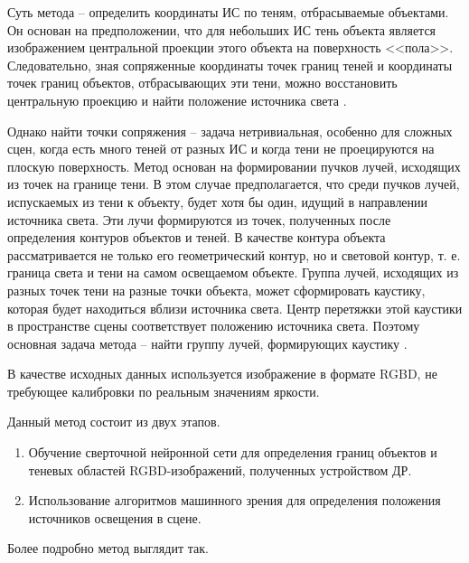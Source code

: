Суть метода -- определить координаты ИС по теням, отбрасываемые объектами. Он основан на предположении, что для небольших ИС тень объекта является изображением центральной проекции этого объекта на поверхность <<пола>>. Следовательно, зная сопряженные координаты точек границ теней и координаты точек границ объектов, отбрасывающих эти тени, можно восстановить центральную проекцию и найти положение источника света \cite{sns_tras}.

Однако найти точки сопряжения -- задача нетривиальная, особенно для сложных сцен, когда есть много теней от разных ИС и когда тени не проецируются на плоскую поверхность. Метод основан на формировании пучков лучей, исходящих из точек на границе тени. В этом случае предполагается, что среди пучков лучей, испускаемых из тени к объекту, будет хотя бы один, идущий в направлении источника света. Эти лучи формируются из точек, полученных после определения контуров объектов и теней. В качестве контура объекта рассматривается не только его геометрический контур, но и световой контур, т. е. граница света и тени на самом освещаемом объекте. Группа лучей, исходящих из разных точек тени на разные точки объекта, может сформировать каустику, которая будет находиться вблизи источника света. Центр перетяжки этой каустики в пространстве сцены соответствует положению источника света. Поэтому основная задача метода -- найти группу лучей, формирующих каустику \cite{sns_tras}.

В качестве исходных данных используется изображение в формате RGBD, не требующее калибровки по реальным значениям яркости.

Данный метод состоит из двух этапов.
\begin{enumerate}
	\item Обучение сверточной нейронной сети для определения границ объектов и теневых областей RGBD-изображений, полученных устройством ДР.
	\item Использование алгоритмов машинного зрения для определения положения источников освещения в сцене.
\end{enumerate}

Более подробно метод выглядит так.

